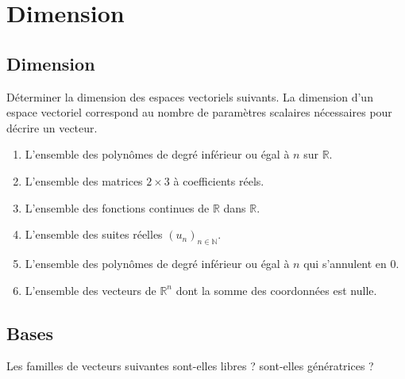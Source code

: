 \section*{Dimension}
\subsection{Dimension}

Déterminer la dimension des espaces vectoriels suivants. 
La dimension d'un espace vectoriel correspond au nombre de paramètres scalaires nécessaires pour décrire un vecteur. 

\begin{enumerate}
    \item L'ensemble des polynômes de degré inférieur ou égal à $n$ sur $\mathbb{R}$.
    \item L'ensemble des matrices $2 \times 3$ à coefficients réels.
    \item L'ensemble des fonctions continues de $\mathbb{R}$ dans $\mathbb{R}$.
    \item L'ensemble des suites réelles $(u_n)_{n \in \mathbb{N}}$.
    \item L'ensemble des polynômes de degré inférieur ou égal à $n$ qui s'annulent en $0$.
    \item L'ensemble des vecteurs de $\mathbb{R}^n$ dont la somme des coordonnées est nulle.
\end{enumerate}

\vspace{2em}

\subsection{Bases}

Les familles de vecteurs suivantes sont-elles libres ? sont-elles génératrices ? 


